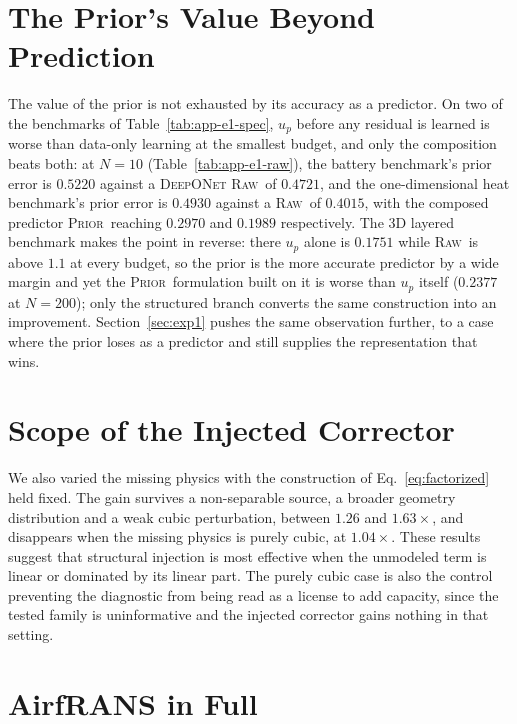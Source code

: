 \documentclass{article}
\newcommand{\armraw}{\textsc{Raw}}
\newcommand{\armprior}{\textsc{Prior}}
\begin{document}
\section{The Prior's Value Beyond Prediction}
\label{app:prior-value}

The value of the prior is not exhausted by its accuracy as a predictor. On two of the
benchmarks of Table~\ref{tab:app-e1-spec}, $u_p$ before any residual is learned is
worse than data-only learning at the smallest budget, and only the composition beats
both: at $N{=}10$ (Table~\ref{tab:app-e1-raw}), the battery benchmark's prior error is
$0.5220$ against a \textsc{DeepONet} \armraw\ of $0.4721$, and the one-dimensional heat
benchmark's prior error is $0.4930$ against a \armraw\ of $0.4015$, with the composed
predictor \armprior\ reaching $0.2970$ and $0.1989$ respectively. The 3D layered benchmark makes
the point in reverse: there $u_p$ alone is $0.1751$ while \armraw\ is above $1.1$ at every
budget, so the prior is the more accurate predictor by a wide margin and yet the \armprior\
formulation built on it is worse than $u_p$ itself ($0.2377$ at $N{=}200$); only the structured
branch converts the same construction into an improvement.
Section~\ref{sec:exp1} pushes the same observation further, to a case where the
prior loses as a predictor and still supplies the representation that wins.

\section{Scope of the Injected Corrector}
\label{app:scope}

We also varied the missing physics with the construction of Eq.~\ref{eq:factorized} held fixed. The gain survives a non-separable source, a broader geometry distribution and a weak cubic perturbation, between $1.26$ and $1.63\times$, and disappears when the missing physics is purely cubic, at $1.04\times$. These results suggest that structural injection is most effective when the unmodeled term is linear or dominated by its linear part. The purely cubic case is also the control preventing the diagnostic from being read as a license to add capacity, since the tested family is uninformative and the injected corrector gains nothing in that setting.



\section{AirfRANS in Full}
\label{app:airfrans}
\end{document}
